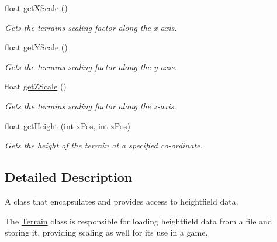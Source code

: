 \begin{DoxyCompactItemize}
float \hyperlink{classterrain_1_1_terrain_a7766261014d1db3e153e34b3edc9234e}{get\+X\+Scale} ()
\begin{DoxyCompactList}\small\item\em Gets the terrain\textquotesingle{}s scaling factor along the x-\/axis. \end{DoxyCompactList}\item 
float \hyperlink{classterrain_1_1_terrain_a5179301129da909722e5061bb7843e93}{get\+Y\+Scale} ()
\begin{DoxyCompactList}\small\item\em Gets the terrain\textquotesingle{}s scaling factor along the y-\/axis. \end{DoxyCompactList}\item 
float \hyperlink{classterrain_1_1_terrain_aab07a6b03ba8893cc839392987bacbe4}{get\+Z\+Scale} ()
\begin{DoxyCompactList}\small\item\em Gets the terrain\textquotesingle{}s scaling factor along the z-\/axis. \end{DoxyCompactList}\item 
float \hyperlink{classterrain_1_1_terrain_a07a8051714942704338182592d9f1ea8}{get\+Height} (int x\+Pos, int z\+Pos)
\begin{DoxyCompactList}\small\item\em Gets the height of the terrain at a specified co-\/ordinate. \end{DoxyCompactList}\end{DoxyCompactItemize}


\subsection{Detailed Description}
A class that encapsulates and provides access to heightfield data. 

The \hyperlink{classterrain_1_1_terrain}{Terrain} class is responsible for loading heightfield data from a file and storing it, providing scaling as well for its use in a game.

